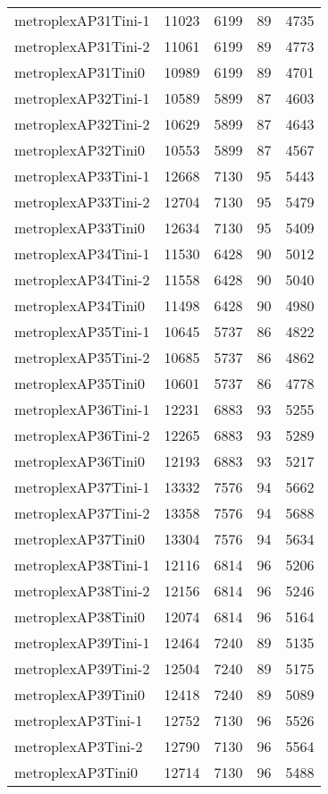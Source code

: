 \begin{longtable}{lrrrr}
metroplexAP31Tini-1 & 11023 & 6199 & 89 & 4735 \\
metroplexAP31Tini-2 & 11061 & 6199 & 89 & 4773 \\
metroplexAP31Tini0 & 10989 & 6199 & 89 & 4701 \\
metroplexAP32Tini-1 & 10589 & 5899 & 87 & 4603 \\
metroplexAP32Tini-2 & 10629 & 5899 & 87 & 4643 \\
metroplexAP32Tini0 & 10553 & 5899 & 87 & 4567 \\
metroplexAP33Tini-1 & 12668 & 7130 & 95 & 5443 \\
metroplexAP33Tini-2 & 12704 & 7130 & 95 & 5479 \\
metroplexAP33Tini0 & 12634 & 7130 & 95 & 5409 \\
metroplexAP34Tini-1 & 11530 & 6428 & 90 & 5012 \\
metroplexAP34Tini-2 & 11558 & 6428 & 90 & 5040 \\
metroplexAP34Tini0 & 11498 & 6428 & 90 & 4980 \\
metroplexAP35Tini-1 & 10645 & 5737 & 86 & 4822 \\
metroplexAP35Tini-2 & 10685 & 5737 & 86 & 4862 \\
metroplexAP35Tini0 & 10601 & 5737 & 86 & 4778 \\
metroplexAP36Tini-1 & 12231 & 6883 & 93 & 5255 \\
metroplexAP36Tini-2 & 12265 & 6883 & 93 & 5289 \\
metroplexAP36Tini0 & 12193 & 6883 & 93 & 5217 \\
metroplexAP37Tini-1 & 13332 & 7576 & 94 & 5662 \\
metroplexAP37Tini-2 & 13358 & 7576 & 94 & 5688 \\
metroplexAP37Tini0 & 13304 & 7576 & 94 & 5634 \\
metroplexAP38Tini-1 & 12116 & 6814 & 96 & 5206 \\
metroplexAP38Tini-2 & 12156 & 6814 & 96 & 5246 \\
metroplexAP38Tini0 & 12074 & 6814 & 96 & 5164 \\
metroplexAP39Tini-1 & 12464 & 7240 & 89 & 5135 \\
metroplexAP39Tini-2 & 12504 & 7240 & 89 & 5175 \\
metroplexAP39Tini0 & 12418 & 7240 & 89 & 5089 \\
metroplexAP3Tini-1 & 12752 & 7130 & 96 & 5526 \\
metroplexAP3Tini-2 & 12790 & 7130 & 96 & 5564 \\
metroplexAP3Tini0 & 12714 & 7130 & 96 & 5488 \\

\end{longtable}
